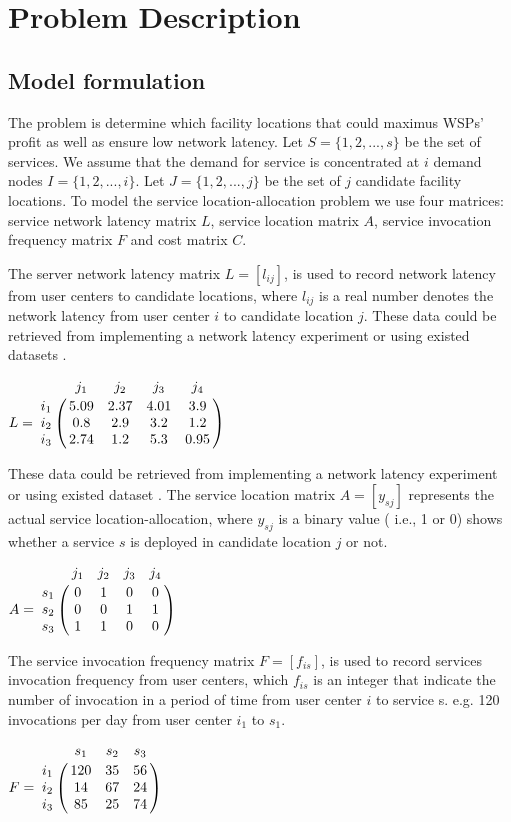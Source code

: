 \documentclass[11pt, a4paper, oneside, openright]{article}
\let\bbordermatrix\bordermatrix
\begin{document}
\section{Problem Description}
\subsection{Model formulation}
The problem is determine which facility locations that could maximus WSPs’ profit as well as ensure low network latency. 
Let $S = \{ 1, 2, ..., s\}$ be the set of services. We assume that the demand for service is concentrated at $i$ 
demand nodes $I = \{ 1, 2, ..., i \}$. Let $J = \{ 1, 2, ..., j \}$ be the set of $j$ candidate facility locations.
To model the service location-allocation problem we use four matrices: service network latency matrix $L$, service location
matrix $A$, service invocation frequency matrix $F$ and cost matrix $C$.

The server network latency matrix $L = [l_{ij}]$, is used to record network latency from user centers to 
candidate locations, where $l_{ij}$ is a real number denotes the network latency from user center $i$ to candidate 
location $j$. 
These data could be retrieved from implementing a network latency experiment or using existed datasets \cite{5552800, 6076756}.
\begin{center}
$
L = \bbordermatrix{~ & j_{1} & j_{2} & j_{3} & j_{4} \cr
					i_{1}	&5.09 &2.37 &4.01	&3.9	\cr
					i_{2}	&0.8  &2.9 &3.2	&1.2 \cr
					i_{3}	&2.74 &1.2 &5.3	&0.95 \cr} 
$
\end{center}
These data could be retrieved from implementing a network latency experiment or using existed dataset \cite{5552800, 6076756}.
The service location matrix $A = [y_{sj}]$ represents the actual service location-allocation, where $y_{sj}$  is a binary value ( i.e., 1 or 0) shows whether a service $s$ is deployed in candidate location $j$ or not.
\begin{center}
$
A = \bbordermatrix{~ & j_{1} & j_{2} & j_{3} & j_{4} \cr
					s_{1}	&0 &1 &0	&0	\cr
					s_{2}	&0  &0 &1	&1 \cr
					s_{3}	&1 &1 &0	&0 \cr} 
$
\end{center}

The service invocation frequency matrix $F= [f_{is}]$, is used to record services invocation frequency from user centers, which $f_{is}$ is an integer that indicate the number of invocation in a period of time from user center $i$ to service s. e.g. 120 invocations per day from user center $i_{1}$ to $s_{1}$.
\begin{center}
$
F = \bbordermatrix{~ & s_{1} & s_{2} & s_{3}  \cr
					i_{1}	&120 &35 &56	\cr
					i_{2}	&14  &67 &24 \cr
					i_{3}	&85 &25 &74 \cr} 
$
\end{center}
\end{document}
